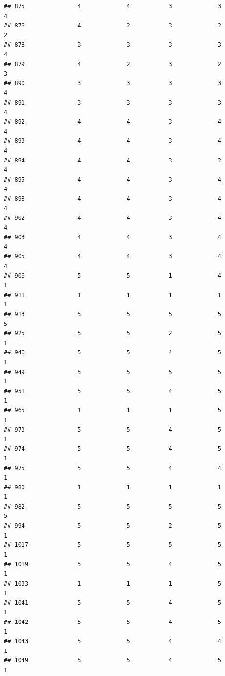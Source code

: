 \documentclass[
]{article}
\begin{document}
\begin{verbatim}
## 875               4             4           3             3            4
## 876               4             2           3             2            2
## 878               3             3           3             3            4
## 879               4             2           3             2            3
## 890               3             3           3             3            4
## 891               3             3           3             3            4
## 892               4             4           3             4            4
## 893               4             4           3             4            4
## 894               4             4           3             2            4
## 895               4             4           3             4            4
## 898               4             4           3             4            4
## 902               4             4           3             4            4
## 903               4             4           3             4            4
## 905               4             4           3             4            4
## 906               5             5           1             4            1
## 911               1             1           1             1            1
## 913               5             5           5             5            5
## 925               5             5           2             5            1
## 946               5             5           4             5            1
## 949               5             5           5             5            1
## 951               5             5           4             5            1
## 965               1             1           1             5            1
## 973               5             5           4             5            1
## 974               5             5           4             5            1
## 975               5             5           4             4            1
## 980               1             1           1             1            1
## 982               5             5           5             5            5
## 994               5             5           2             5            1
## 1017              5             5           5             5            1
## 1019              5             5           4             5            1
## 1033              1             1           1             5            1
## 1041              5             5           4             5            1
## 1042              5             5           4             5            1
## 1043              5             5           4             4            1
## 1049              5             5           4             5            1

\end{verbatim}
\end{document}
